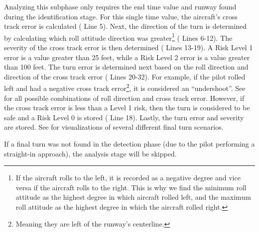             Analyzing this subphase only requires the end time value and runway found during the identification stage.  For this single time value, the aircraft's cross track error is calculated ( Line 5).  Next, the direction of the turn is determined by calculating which roll attitude direction was greater\footnote{If the aircraft rolls to the left, it is recorded as a negative degree and vice versa if the aircraft rolls to the right.  This is why we find the minimum roll attitude as the highest degree in which aircraft rolled left, and the maximum roll attitude as the highest degree in which the aircraft rolled right.} ( Lines 6-12).  The severity of the cross track error is then determined ( Lines 13-19).  A Risk Level 1 error is a value greater than 25 feet, while a Risk Level 2 error is a value greater than 100 feet.  The turn error is determined next based on the roll direction and direction of the cross track error ( Lines 20-32).  For example, if the pilot rolled left and had a negative cross track error\footnote{Meaning they are left of the runway's centerline.}, it is considered an ``undershoot''.  See  for all possible combinations of roll direction and cross track error.  However, if the cross track error is less than a Level 1 risk, then the turn is considered to be safe and a Risk Level 0 is stored ( Line 18).  Lastly, the turn error and severity are stored.  See  for visualizations of several different final turn scenarios.
            
            If a final turn was not found in the detection phase (due to the pilot performing a straight-in approach), the analysis stage will be skipped.
            
